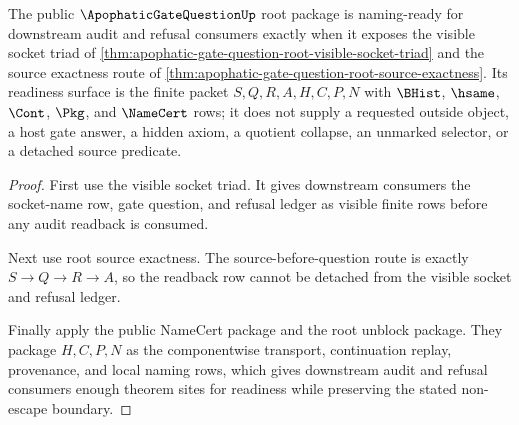 \begin{theorem}
\label{thm:apophatic-gate-question-root-naming-readiness}
The public $\ApophaticGateQuestionUp$ root package is naming-ready for downstream audit and refusal consumers exactly when it exposes the visible socket triad of \autoref{thm:apophatic-gate-question-root-visible-socket-triad} and the source exactness route of \autoref{thm:apophatic-gate-question-root-source-exactness}. Its readiness surface is the finite packet $S,Q,R,A,H,C,P,N$ with $\BHist$, $\hsame$, $\Cont$, $\Pkg$, and $\NameCert$ rows; it does not supply a requested outside object, a host gate answer, a hidden axiom, a quotient collapse, an unmarked selector, or a detached source predicate.
\end{theorem}
\begin{proof}
First use the visible socket triad. It gives downstream consumers the socket-name row, gate question, and refusal ledger as visible finite rows before any audit readback is consumed.

Next use root source exactness. The source-before-question route is exactly $S \to Q \to R \to A$, so the readback row cannot be detached from the visible socket and refusal ledger.

Finally apply the public NameCert package and the root unblock package. They package $H,C,P,N$ as the componentwise transport, continuation replay, provenance, and local naming rows, which gives downstream audit and refusal consumers enough theorem sites for readiness while preserving the stated non-escape boundary.
\end{proof}
